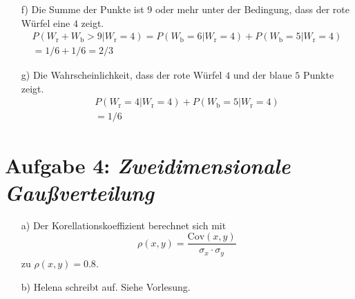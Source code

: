 \begin{itemize}
\item[f)] Die Summe der Punkte ist $9$ oder mehr unter der Bedingung, dass der rote Würfel eine $4$ zeigt.
\begin{align*}
P(W_{\text{r}} + W_{\text{b}} > 9|W_{\text{r}} = 4)
= P(W_{\text{b}} = 6|W_{\text{r}} = 4) + P(W_{\text{b}} = 5|W_{\text{r}} = 4)\\
= 1/6 + 1/6 = 2/3 
\end{align*}


\item[g)]Die Wahrscheinlichkeit, dass der rote Würfel $4$ und der blaue $5$ Punkte zeigt.
\begin{align*}
P(W_{\text{r}} = 4|W_{\text{r}} = 4) + P(W_{\text{b}} = 5|W_{\text{r}} = 4)\\
=1/6
\end{align*}
\end{itemize}

\section*{Aufgabe 4: \emph{Zweidimensionale Gaußverteilung}}

\begin{itemize}
\item[a)] Der Korellationskoeffizient berechnet sich mit
\begin{equation}
\rho(x,y)=\frac{\text{Cov}(x,y)}{\sigma_x\cdot\sigma_y}
\end{equation}
zu $\rho(x,y)=0.8.$

\item[b)] Helena schreibt auf. Siehe Vorlesung.


\end{itemize}
